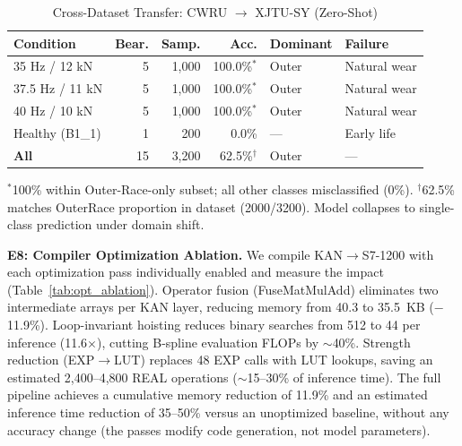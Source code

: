 \documentclass[journal,onecolumn]{IEEEtran}
\begin{document}
\begin{table}[t]
\centering
\caption{Cross-Dataset Transfer: CWRU $\to$ XJTU-SY (Zero-Shot)}
\label{tab:xjtu_sy}
\footnotesize
\begin{tabular}{@{}p{2.2cm}rrrp{1.5cm}p{1.7cm}@{}}
\toprule
\textbf{Condition} & \textbf{Bear.} & \textbf{Samp.} & \textbf{Acc.} & \textbf{Dominant} & \textbf{Failure} \\
\midrule
35 Hz / 12 kN    & 5 & 1,000 & 100.0\%$^{*}$ & Outer & Natural wear \\
37.5 Hz / 11 kN  & 5 & 1,000 & 100.0\%$^{*}$ & Outer & Natural wear \\
40 Hz / 10 kN    & 5 & 1,000 & 100.0\%$^{*}$ & Outer & Natural wear \\
Healthy (B1\_1)  & 1 & 200   & 0.0\% & --- & Early life \\
\midrule
\textbf{All}     & 15 & 3,200 & 62.5\%$^{\dag}$ & Outer & --- \\
\bottomrule
\end{tabular}
\vspace{1pt}
{\scriptsize $^{*}$100\% within Outer-Race-only subset; all other classes
misclassified (0\%). $^{\dag}$62.5\% matches OuterRace proportion in dataset
(2000/3200). Model collapses to single-class prediction under domain shift.}
\end{table}

\noindent\textbf{E8: Compiler Optimization Ablation.} We compile KAN$\to$S7-1200
with each optimization pass individually enabled and measure the impact
(Table~\ref{tab:opt_ablation}). Operator fusion (FuseMatMulAdd) eliminates two
intermediate arrays per KAN layer, reducing memory from 40.3 to 35.5~KB
($-$11.9\%). Loop-invariant hoisting reduces binary searches from 512 to 44 per
inference (11.6$\times$), cutting B-spline evaluation FLOPs by $\sim$40\%.
Strength reduction (EXP$\to$LUT) replaces 48 EXP calls with LUT lookups,
saving an estimated 2,400--4,800 REAL operations ($\sim$15--30\% of inference
time). The full pipeline achieves a cumulative memory reduction of 11.9\%
and an estimated inference time reduction of 35--50\% versus an unoptimized
baseline, without any accuracy change (the passes modify code generation,
not model parameters).
\end{document}

